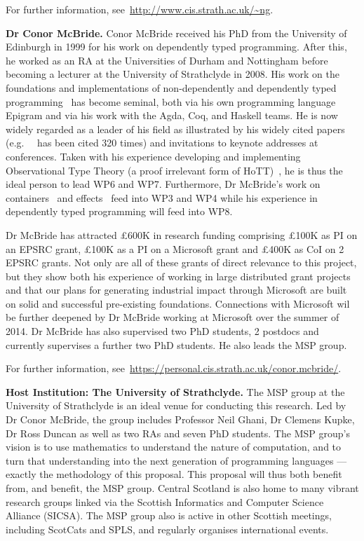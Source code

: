 \documentclass[a4paper,11pt]{article}
\newcommand{\eg}{{e.g.}\ }
\begin{document}
For further information, see~\url{http://www.cis.strath.ac.uk/~ng}.

\textbf{Dr Conor McBride.} Conor McBride received his PhD from the
University of Edinburgh in 1999 for his work on dependently typed
programming. After this, he worked as an RA at the Universities of
Durham and Nottingham before becoming a lecturer at the University of
Strathclyde in 2008. His work on the foundations and implementations
of non-dependently and dependently typed
programming~\cite{viewftl,alti:ott-conf,easy}
has become seminal, both via his own programming language
Epigram and via his work with the Agda, Coq, and Haskell teams. He is
now widely regarded as a leader of his field as illustrated by his
widely cited papers (\eg ~\cite{viewftl} has been cited 320 times) and
invitations to keynote addresses at conferences. Taken with his
experience developing and implementing Observational Type Theory (a
proof irrelevant form of HoTT)~\cite{alti:ott-conf}, he is
thus the ideal person to lead WP6 and WP7. Furthermore, Dr McBride's
work on containers~\cite{alti:mpc04}
and effects~\cite{conor:frank} feed into WP3 and WP4 while his experience
in dependently typed programming will feed into WP8.

Dr McBride has attracted \pounds 600K in research funding comprising
\pounds 100K as PI on an EPSRC grant, \pounds 100K as a PI on a
Microsoft grant and \pounds 400K as CoI on 2 EPSRC grants. Not only
are all of these grants of direct relevance to this project, but they
show both his experience of working in large distributed grant
projects and that our plans for generating industrial impact through
Microsoft are built on solid and successful pre-existing
foundations. Connections with Microsoft wil be further deepened by Dr
McBride working at Microsoft over the summer of 2014.  Dr McBride has
also supervised two PhD students, 2 postdocs and currently supervises
a further two PhD students. He also leads the MSP group.

For further information,
see~\url{https://personal.cis.strath.ac.uk/conor.mcbride/}.

\textbf{Host Institution: The University of Strathclyde.} The MSP
group at the University of Strathclyde is an ideal venue for
conducting this research. Led by Dr Conor McBride, the group includes
Professor Neil Ghani, Dr Clemens Kupke, Dr Ross Duncan as well as two RAs and seven PhD students. The MSP group's vision is to use
mathematics to understand the nature of computation, and to turn that
understanding into the next generation of programming languages ---
exactly the methodology of this proposal. This proposal will thus both
benefit from, and benefit, the MSP group. Central Scotland
is also home to many vibrant research groups linked via  the Scottish
Informatics and Computer Science Alliance (SICSA). The MSP group also
is active in other Scottish meetings, including ScotCats and SPLS, and
regularly organises international events.
\end{document}
